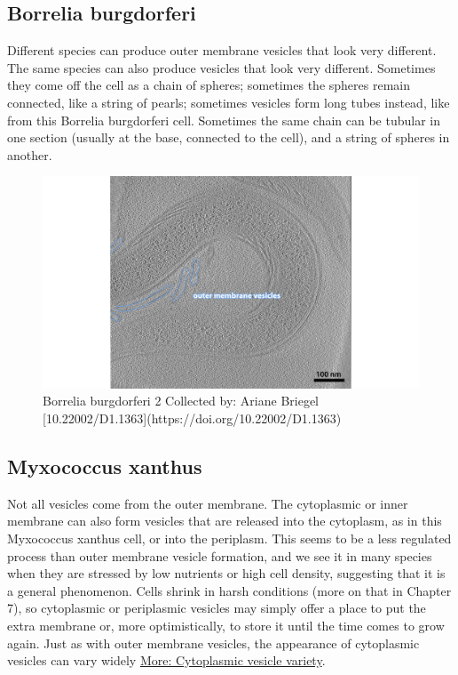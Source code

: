\documentclass[]{tufte-book}
\begin{document}
\hypertarget{Vesicle_morphologies}{\subsection{Borrelia
burgdorferi}\label{Vesicle_morphologies}}

Different species can produce outer membrane vesicles that look very
different. The same species can also produce vesicles that look very
different. Sometimes they come off the cell as a chain of spheres;
sometimes the spheres remain connected, like a string of pearls;
sometimes vesicles form long tubes instead, like from this Borrelia
burgdorferi cell. Sometimes the same chain can be tubular in one section
(usually at the base, connected to the cell), and a string of spheres in
another.

\begin{figure}
\includegraphics{img/2_4a_Bburgdorferi} \caption[Borrelia burgdorferi 2 Collected by]{Borrelia burgdorferi 2 Collected by: Ariane Briegel [10.22002/D1.1363](https://doi.org/10.22002/D1.1363)}\label{fig:unnamed-chunk-12}
\end{figure}

\subsection{Myxococcus xanthus}\label{Inner_membrane_vesicles}

Not all vesicles come from the outer membrane. The cytoplasmic or inner
membrane can also form vesicles that are released into the cytoplasm, as
in this Myxococcus xanthus cell, or into the periplasm. This seems to be
a less regulated process than outer membrane vesicle formation, and we
see it in many species when they are stressed by low nutrients or high
cell density, suggesting that it is a general phenomenon. Cells shrink
in harsh conditions (more on that in Chapter 7), so cytoplasmic or
periplasmic vesicles may simply offer a place to put the extra membrane
or, more optimistically, to store it until the time comes to grow again.
Just as with outer membrane vesicles, the appearance of cytoplasmic
vesicles can vary widely
\protect\hyperlink{Cytoplasmic_vesicle_variety}{More: Cytoplasmic
vesicle variety}.
\end{document}
